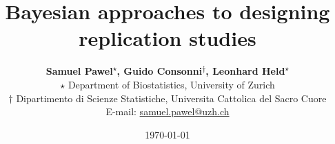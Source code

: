 \usepackage[T1]{fontenc}
\usepackage[utf8]{inputenc}
\usepackage[english]{babel}
\usepackage{amsmath, amssymb}
\usepackage{doi} %
\usepackage[round]{natbib} %
\usepackage{multirow} %
\usepackage{longtable} %
\usepackage{booktabs} %
\usepackage[title]{appendix} %
\usepackage{nameref} %


\usepackage{times} %
\usepackage[semibold]{sourcesanspro} %
\usepackage{sectsty} %
\allsectionsfont{\sffamily} %
\usepackage[onehalfspacing]{setspace} %
\usepackage[labelfont=bf,font=small]{caption} %


\usepackage{tikz}
\usetikzlibrary{positioning,shapes,fit}

\usepackage{geometry}

\newcommand\longtitle{Bayesian approaches to designing replication studies}
\newcommand\shorttitle{\longtitle} %
\newcommand\longauthors{Samuel Pawel\textsuperscript{$\star$}, Guido
  Consonni\textsuperscript{$\dagger$}, Leonhard
  Held\textsuperscript{$\star$}}
\newcommand\shortauthors{S. Pawel, G. Consonni,
  L. Held} %
\newcommand\affiliation{
  $\star$ Department of Biostatistics, University of Zurich \\
  $\dagger$ Dipartimento di Scienze Statistiche, Universita Cattolica del Sacro
  Cuore } \newcommand\mail{samuel.pawel@uzh.ch} \title{ \vspace{-2em}
  \textbf{\longtitle} } \author{
  \textbf{\longauthors} \\
  \affiliation \\
  E-mail: \href{mailto:\mail}{\mail} }
  \date{\today} %

